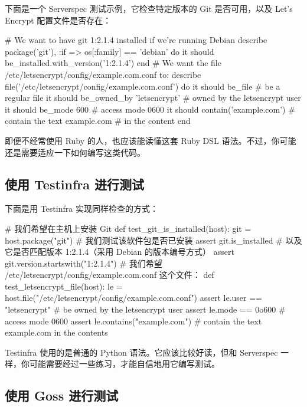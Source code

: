\label{idx:887}
\label{idx:888}
下面是一个 Serverspec 测试示例，它检查特定版本的 Git 是否可用，以及 Let's Encrypt 配置文件是否存在：

\begin{codebox}[text]
# We want to have git 1:2.1.4 installed if we're running Debian
describe package('git'), :if => os[:family] == 'debian' do
  it { should be_installed.with_version('1:2.1.4') }
end
# We want the file /etc/letsencrypt/config/example.com.conf to:
describe file('/etc/letsencrypt/config/example.com.conf') do
  it { should be_file } # be a regular file
  it { should be_owned_by 'letsencrypt' } # owned by the letsencrypt user
  it { should be_mode 600 } # access mode 0600
  it { should contain('example.com') } # contain the text example.com
                                       # in the content
end
\end{codebox}

即便不经常使用 Ruby 的人，也应该能读懂这套 Ruby DSL 语法。不过，你可能还是需要适应一下如何编写这类代码。

\subsection{使用 Testinfra 进行测试}

\label{idx:889}
\label{idx:890}
下面是用 Testinfra 实现同样检查的方式：

\begin{codebox}[python]
# 我们希望在主机上安装 Git
def test_git_is_installed(host):
    git = host.package("git")
    # 我们测试该软件包是否已安装
    assert git.is_installed
    # 以及它是否匹配版本 1:2.1.4（采用 Debian 的版本编号方式）
    assert git.version.startswith("1:2.1.4")
# 我们希望 /etc/letsencrypt/config/example.com.conf 这个文件：
def test_letsencrypt_file(host):
    le = host.file("/etc/letsencrypt/config/example.com.conf")
    assert le.user == "letsencrypt" # be owned by the letsencrypt user
    assert le.mode == 0o600 # access mode 0600
    assert le.contains("example.com") # contain the text example.com in the contents
\end{codebox}

\label{idx:891}
\label{idx:892}
Testinfra 使用的是普通的 Python 语法。它应该比较好读，但和 Serverspec 一样，你可能需要经过一些练习，才能自信地用它编写测试。

\subsection{使用 Goss 进行测试}

